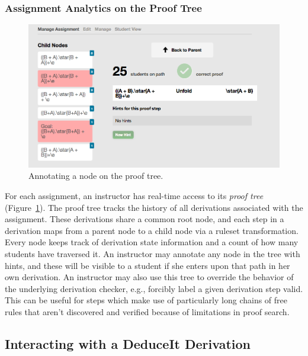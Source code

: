 \documentclass{sigchi}
\newcommand{\msb}[1]{\textbf{\textcolor{cyan}{Michael: #1}}}
\begin{document}

\subsubsection{Assignment Analytics on the Proof Tree}
\begin{figure}[tb]
\centering
\includegraphics[width=1\columnwidth]{nodeannote}
\caption{Annotating a node on the proof tree.}
\label{fig:nodeannote}
\end{figure}

For each assignment, an instructor has real-time access to its \emph{proof tree} (Figure~\ref{fig:nodeannote}). The proof tree tracks the history of all derivations associated with the assignment. These derivations share a common root node, and each step in a derivation maps from a parent node to a child node via a ruleset transformation. Every node keeps track of derivation state information and a count of how many students have traversed it. An instructor may annotate any node in the tree with hints, and these will be visible to a student if she enters upon that path in her own derivation. An instructor may also use this tree to override the behavior of the underlying derivation checker, e.g., forcibly label a given derivation step valid. This can be useful for steps which make use of particularly long chains of free rules that aren't discovered and verified because of limitations in proof search. %


\subsection{Interacting with a DeduceIt Derivation}
\end{document}
